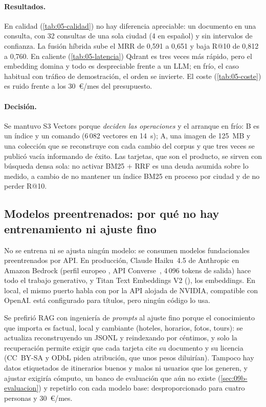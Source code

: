 \paragraph{Resultados.} En calidad (\cref{tab:05-calidad}) no hay diferencia apreciable: un
documento en una consulta, con 32 consultas de una sola ciudad (4 en español) y sin intervalos de
confianza. La fusión híbrida sube el MRR de 0,591 a 0,651 y baja R@10 de 0,812 a 0,760. En caliente (\cref{tab:05-latencia}) Qdrant es tres veces más rápido, pero el
embedding domina y todo es despreciable frente a un LLM; en frío, el caso habitual con tráfico de
demostración, el orden se invierte. El coste (\cref{tab:05-coste}) es ruido frente a los 30~€/mes del presupuesto.

\paragraph{Decisión.} Se mantuvo S3 Vectors porque \emph{deciden las operaciones} y el arranque en frío: B es un índice
y un comando (6\,082 vectores en 14~s); A, una imagen de 125~MB y una colección que se reconstruye
con cada cambio del corpus y que tres veces se publicó vacía informando de éxito. Las tarjetas, que son el producto, se sirven con búsqueda densa sola: no
activar BM25 + RRF es una deuda asumida sobre lo medido, a cambio de no mantener un índice BM25 en
proceso por ciudad y de no perder R@10.

\subsection{Modelos preentrenados: por qué no hay entrenamiento ni ajuste fino}\label{sec:05-modelos}

No se entrena ni se ajusta ningún modelo: se consumen modelos fundacionales preentrenados por
API. En producción, Claude Haiku~4.5 de Anthropic en Amazon Bedrock (perfil europeo
, API Converse~\cite{ai:converse}, 4\,096
tokens de salida) hace todo el trabajo generativo, y Titan Text Embeddings V2
(), los embeddings. En local, el mismo puerto habla con
 por la API alojada de NVIDIA, compatible con OpenAI.
 está configurado para títulos, pero ningún código lo usa.

Se prefirió RAG con ingeniería de \emph{prompts} al ajuste fino porque el conocimiento que
importa es factual, local y cambiante (hoteles, horarios, fotos, tours): se actualiza
reconstruyendo un JSONL y reindexando por céntimos, y solo la recuperación permite exigir que
cada tarjeta cite su documento y su licencia (CC~BY-SA y ODbL piden atribución, que unos pesos
diluirían). Tampoco hay datos etiquetados de itinerarios buenos y malos ni usuarios que los
generen, y ajustar exigiría cómputo, un banco de evaluación que aún no existe
(\cref{sec:09b-evaluacion}) y repetirlo con cada modelo base: desproporcionado para cuatro personas
y 30~€/mes.

